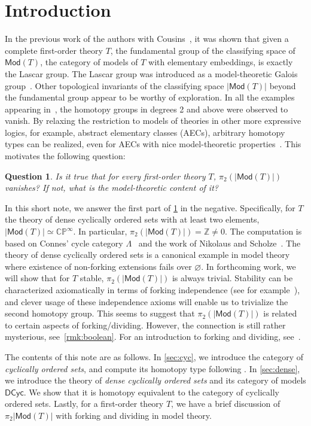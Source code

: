 \documentclass{amsart}
\theoremstyle{plain}
\newtheorem{question}[thm]{Question}
\theoremstyle{definition}
\newcommand{\ints}{\mathbb{Z}}
\newcommand{\Mod}{\mathsf{Mod}}
\newcommand{\DCyc}{\mathsf{DCyc}}
\begin{document}
\section{Introduction}
In the previous work of the authors with Cousins~\cite{lascar-homotopy}, it was shown that given a complete first-order theory $T$, the fundamental group of the classifying space of $\Mod(T)$, the category of models of $T$ with elementary embeddings, is exactly the Lascar group. The Lascar group was introduced as a model-theoretic Galois group~\cite{lascar}. Other topological invariants of the classifying space $|\Mod(T)|$ beyond the fundamental group appear to be worthy of exploration. In all the examples appearing in~\cite{lascar-homotopy}, the homotopy groups in degrees 2 and above were observed to vanish. By relaxing the restriction to models of theories in other more expressive logics, for example, abstract elementary classes (AECs), arbitrary homotopy types can be realized, even for AECs with nice model-theoretic properties~\cite{higher-aec}. This motivates the following question:
\begin{question}\label{question}
Is it true that for every first-order theory $T$, $\pi_2(\lvert\Mod(T)\rvert)$ vanishes? If not, what is the model-theoretic content of it?
\end{question}
In this short note, we answer the first part of \cref{question} in the negative. Specifically, for $T$ the theory of dense cyclically ordered sets with at least two elements, $\lvert\Mod(T)\rvert\simeq \mathbb{CP}^\infty$. In particular, $\pi_2(\lvert \Mod(T) \rvert) = \ints \neq 0$. The computation is based on Connes' cycle category $\Lambda$~\cite{connes} and the work of Nikolaus and Scholze~\cite{nikolaus-scholze}. The theory of dense cyclically ordered sets is a canonical example in model theory where existence of non-forking extensions fails over $\varnothing$.  In forthcoming work, we will show that for $T$ stable, $\pi_2(\lvert\Mod(T)\rvert)$ is always trivial. Stability can be characterized axiomatically in terms of forking independence (see for example~\cite{harrington,kim-pillay}), and clever usage of these independence axioms will enable us to trivialize the second homotopy group. This seems to suggest that $\pi_2(\lvert\Mod(T)\rvert)$ is related to certain aspects of forking/dividing. However, the connection is still rather mysterious, see~\cref{rmk:boolean}. For an introduction to forking and dividing, see~\cite[Chapter 7]{tent-ziegler}.

The contents of this note are as follows. In \cref{sec:cyc}, we introduce the category of \emph{cyclically ordered sets}, and compute its homotopy type following \cite{nikolaus-scholze}. In \cref{sec:dense}, we introduce the theory of \emph{ dense cyclically ordered sets} and its category of models $\DCyc$. We show that it is homotopy equivalent to the category of cyclically ordered sets. Lastly, for a first-order theory $T$, we have a brief discussion of $\pi_2|\Mod(T)|$ with forking and dividing in model theory.
\end{document}
